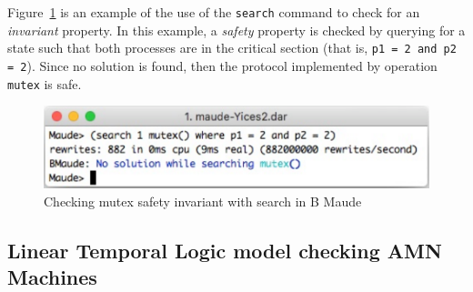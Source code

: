 \documentclass[a4paper,openany]{book}
\makeatletter
\def\maxwidth{\ifdim\Gin@nat@width>\linewidth\linewidth
    \else\Gin@nat@width\fi}
\let\Oldincludegraphics\includegraphics
\renewcommand{\includegraphics}[1]{\Oldincludegraphics[width=.8\maxwidth]{#1}}
\makeatother
\begin{document}
Figure~\ref{fig:mutex-safety} is an example of the use of the \texttt{search} command to check for an \emph{invariant} property. In this example, a \emph{safety} property is checked by querying for a state such that both processes are in the critical section (that is, \texttt{p1 = 2 and p2 = 2}). Since no solution is found, then the protocol implemented by operation \texttt{mutex} is safe.
\begin{figure}[ht]\centering
\includegraphics{mutex-safety2}
\caption{Checking mutex safety invariant with search in B Maude}\label{fig:mutex-safety}
\end{figure}
%

\subsection{Linear Temporal Logic model checking AMN Machines}\label{sec:amn-mc}
\end{document}

